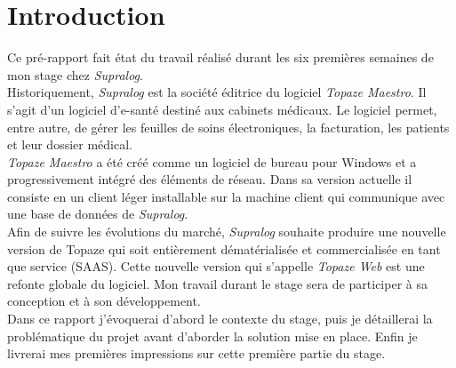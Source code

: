 \newpage
\section{Introduction} %

Ce pré-rapport fait état du travail réalisé durant les six premières semaines de mon stage chez \textit{Supralog}.\\
Historiquement, \textit{Supralog} est la société éditrice du logiciel \textit{\gls{Topaze Maestro}}. Il s’agit d’un logiciel d’e-santé destiné aux cabinets médicaux. Le logiciel permet, entre autre, de gérer les feuilles de soins électroniques, la facturation, les patients et leur dossier médical.\\
\textit{Topaze Maestro} a été créé comme un logiciel de bureau pour Windows et a progressivement intégré des éléments de réseau. Dans sa version actuelle il consiste en un client léger installable sur la machine client qui communique avec une base de données de \textit{Supralog}.\\

Afin de suivre les évolutions du marché, \textit{Supralog} souhaite produire une nouvelle version de Topaze qui soit entièrement dématérialisée et commercialisée en tant que service (\gls{SAAS}). Cette nouvelle version qui s’appelle \textit{\gls{Topaze Web}} est une refonte globale du logiciel. Mon travail durant le stage sera de participer à sa conception et à son développement.\\

Dans ce rapport j’évoquerai d’abord le contexte du stage, puis je détaillerai la problématique du projet avant d’aborder la solution mise en place. Enfin je livrerai mes premières impressions sur cette première partie du stage.

